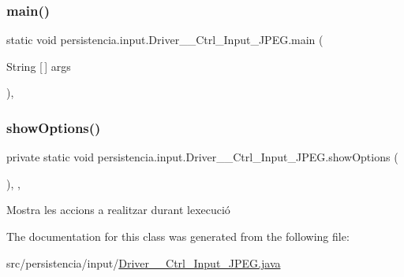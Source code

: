 \subsubsection{\texorpdfstring{main()}{main()}}
{\footnotesize\ttfamily static void persistencia.\+input.\+Driver\+\_\+\+\_\+\+Ctrl\+\_\+\+Input\+\_\+\+J\+P\+E\+G.\+main (\begin{DoxyParamCaption}\item[{String \mbox{[}$\,$\mbox{]}}]{args }\end{DoxyParamCaption})\hspace{0.3cm}{\ttfamily [inline]}, {\ttfamily [static]}}

\mbox{\label{classpersistencia_1_1input_1_1Driver____Ctrl__Input__JPEG_a3ffde336b648d23ae0a517210d0f8f38}} 
\subsubsection{\texorpdfstring{show\+Options()}{showOptions()}}
{\footnotesize\ttfamily private static void persistencia.\+input.\+Driver\+\_\+\+\_\+\+Ctrl\+\_\+\+Input\+\_\+\+J\+P\+E\+G.\+show\+Options (\begin{DoxyParamCaption}{ }\end{DoxyParamCaption})\hspace{0.3cm}{\ttfamily [inline]}, {\ttfamily [static]}, {\ttfamily [private]}}



Mostra les accions a realitzar durant l\textquotesingle{}execució 



The documentation for this class was generated from the following file\+:\begin{DoxyCompactItemize}
\item 
src/persistencia/input/\hyperlink{Driver____Ctrl__Input__JPEG_8java}{Driver\+\_\+\+\_\+\+Ctrl\+\_\+\+Input\+\_\+\+J\+P\+E\+G.\+java}\end{DoxyCompactItemize}
